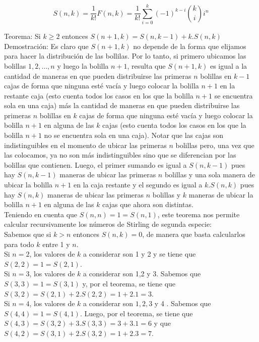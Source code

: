 \documentclass[10pt]{article}
\begin{document}
$$
S(n, k)=\frac{1}{k!} F(n, k)=\frac{1}{k!} \sum_{i=0}^{k}(-1)^{k-i}\binom{k}{i} i^{n}
$$

Teorema: Si $k \geq 2$ entonces $S(n+1, k)=S(n, k-1)+k . S(n, k)$\\
Demostración: Es claro que $S(n+1, k)$ no depende de la forma que elijamos para hacer la distribución de las bollilas. Por lo tanto, si primero ubicamos las bolillas $1,2, \ldots, n$ y luego la bolilla $n+1$, resulta que $S(n+1, k)$ es igual a la cantidad de maneras en que pueden distribuirse las primeras $n$ bolillas en $k-1$ cajas de forma que ninguna esté vacía y luego colocar la bolilla $n+1$ en la restante caja (esto cuenta todos los casos en los que la bolilla $n+1$ se encuentra sola en una caja) más la cantidad de maneras en que pueden distribuirse las primeras $n$ bolillas en $k$ cajas de forma que ninguna esté vacía y luego colocar la bolilla $n+1$ en alguna de las $k$ cajas (esto cuenta todos los casos en los que la bolilla $n+1$ no se encuentra sola en una caja). Notar que las cajas son indistinguibles en el momento de ubicar las primeras $n$ bolillas pero, una vez que las colocamos, ya no son más indistinguibles sino que se diferencian por las bolillas que contienen. Luego, el primer sumando es igual a $S(n, k-1)$ pues hay $S(n, k-1)$ maneras de ubicar las primeras $n$ bolillas y una sola manera de ubicar la bolilla $n+1$ en la caja restante y el segundo es igual a $k . S(n, k)$ pues hay $S(n, k)$ maneras de ubicar las primeras $n$ bolillas y $k$ maneras de ubicar la bolilla $n+1$ en alguna de las $k$ cajas que ahora son distintas.\\
Teniendo en cuenta que $S(n, n)=1=S(n, 1)$, este teorema nos permite calcular recursivamente los números de Stirling de segunda especie:\\
Sabemos que si $k>n$ entonces $S(n, k)=0$, de manera que basta calcularlos para todo $k$ entre 1 y $n$.\\
Si $n=2$, los valores de $k$ a considerar son 1 y 2 y se tiene que $S(2,2)=1=S(2,1)$.\\
Si $n=3$, los valores de $k$ a considerar son 1,2 y 3. Sabemos que $S(3,3)=1=S(3,1)$ y, por el teorema, se tiene que $S(3,2)=S(2,1)+2 . S(2,2)=1+2.1=3$.\\
Si $n=4$, los valores de $k$ a considerar son $1,2,3$ y 4 . Sabemos que $S(4,4)=1=S(4,1)$. Luego, por el teorema, se tiene que $S(4,3)=S(3,2)+3 . S(3,3)=3+3.1=6$ y que $S(4,2)=S(3,1)+2 . S(3,2)=1+2.3=7$.
\end{document}
